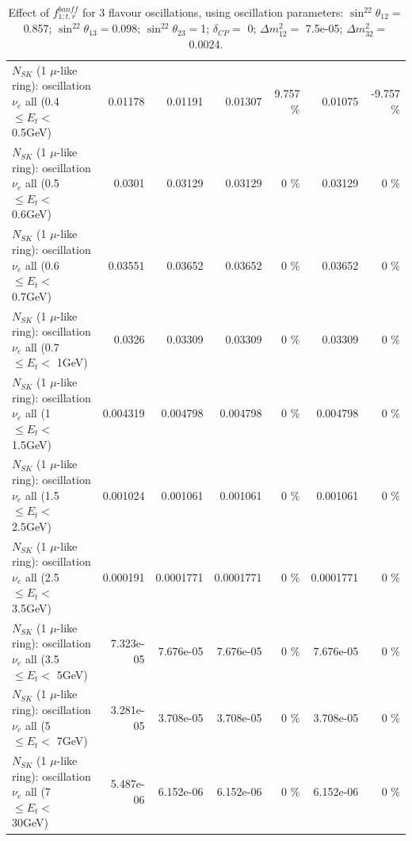 \begin{table}
\begin{tabular}{| l | r | r | r  r | r  r |}
$N_{SK}$ (1 $\mu$-like ring): oscillation $\nu_{e}$ all (0.4 $\leq E_{t} <$ 0.5GeV) &         0.01178 &         0.01191 &         0.01307 &    9.757 \%  &         0.01075 &   -9.757 \%  \\ 
$N_{SK}$ (1 $\mu$-like ring): oscillation $\nu_{e}$ all (0.5 $\leq E_{t} <$ 0.6GeV) &          0.0301 &         0.03129 &         0.03129 &        0 \%  &         0.03129 &        0 \%  \\ 
$N_{SK}$ (1 $\mu$-like ring): oscillation $\nu_{e}$ all (0.6 $\leq E_{t} <$ 0.7GeV) &         0.03551 &         0.03652 &         0.03652 &        0 \%  &         0.03652 &        0 \%  \\ 
$N_{SK}$ (1 $\mu$-like ring): oscillation $\nu_{e}$ all (0.7 $\leq E_{t} <$ 1GeV) &          0.0326 &         0.03309 &         0.03309 &        0 \%  &         0.03309 &        0 \%  \\ 
$N_{SK}$ (1 $\mu$-like ring): oscillation $\nu_{e}$ all (1 $\leq E_{t} <$ 1.5GeV) &        0.004319 &        0.004798 &        0.004798 &        0 \%  &        0.004798 &        0 \%  \\ 
$N_{SK}$ (1 $\mu$-like ring): oscillation $\nu_{e}$ all (1.5 $\leq E_{t} <$ 2.5GeV) &        0.001024 &        0.001061 &        0.001061 &        0 \%  &        0.001061 &        0 \%  \\ 
$N_{SK}$ (1 $\mu$-like ring): oscillation $\nu_{e}$ all (2.5 $\leq E_{t} <$ 3.5GeV) &        0.000191 &       0.0001771 &       0.0001771 &        0 \%  &       0.0001771 &        0 \%  \\ 
$N_{SK}$ (1 $\mu$-like ring): oscillation $\nu_{e}$ all (3.5 $\leq E_{t} <$ 5GeV) &       7.323e-05 &       7.676e-05 &       7.676e-05 &        0 \%  &       7.676e-05 &        0 \%  \\ 
 $N_{SK}$ (1 $\mu$-like ring): oscillation $\nu_{e}$ all (5 $\leq E_{t} <$ 7GeV) &       3.281e-05 &       3.708e-05 &       3.708e-05 &        0 \%  &       3.708e-05 &        0 \%  \\ 
$N_{SK}$ (1 $\mu$-like ring): oscillation $\nu_{e}$ all (7 $\leq E_{t} <$ 30GeV) &       5.487e-06 &       6.152e-06 &       6.152e-06 &        0 \%  &       6.152e-06 &        0 \%  \\ 
\hline
\hline
\end{tabular}
\caption{ Effect of $f_{1; t, r}^{banff}$ for 3 flavour oscillations, using oscillation parameters:  $\sin^22\theta_{12} = $0.857; $\sin^22\theta_{13} = $0.098; $\sin^22\theta_{23} = $1; $\delta_{CP} = $        0; $\Delta m^2_{12} = $    7.5e-05; $\Delta m^2_{32} = $    0.0024. }
\label{tab:num_banff_01_1RmuT_3f_osc_t13:0.098}
\end{table}
